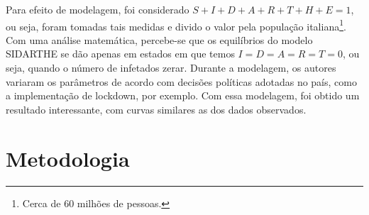 \documentclass{article}
\begin{document}
Para efeito de modelagem, foi considerado $S + I + D + A + R + T + H + E = 1$, ou seja, foram tomadas tais medidas e divido o valor pela população italiana\footnote{Cerca de 60 milhões de pessoas.}. Com uma análise matemática, percebe-se que os equilíbrios do modelo SIDARTHE se dão apenas em estados em que temos $I = D = A = R = T = 0$, ou seja, quando o número de infetados zerar. Durante a modelagem, os autores variaram os parâmetros de acordo com decisões políticas adotadas no país, como a implementação de lockdown, por exemplo. Com essa modelagem, foi obtido um resultado interessante, com curvas similares as dos dados observados.






\cite{fSEIRD}


\section{Metodologia}


\printbibliography
\end{document}
